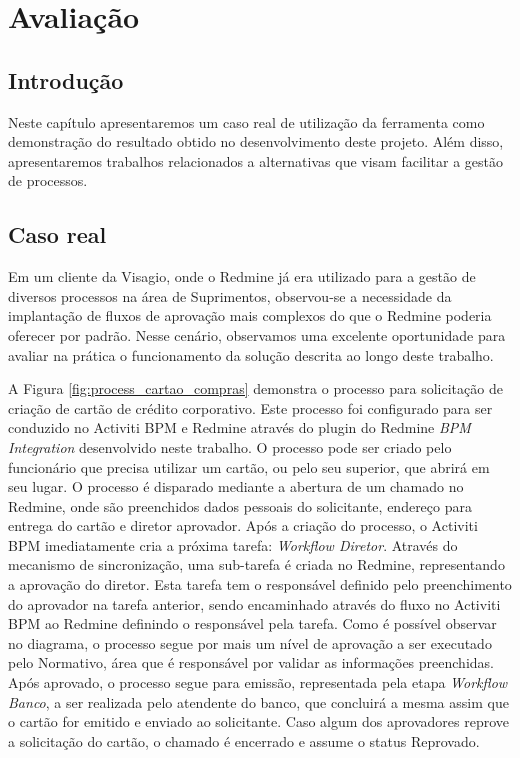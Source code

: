 \chapter{Avaliação}\label{chp:resultado}

\section{Introdução}\label{sec:resultado-introducao}
Neste capítulo apresentaremos um caso real de utilização da ferramenta como demonstração do resultado obtido no desenvolvimento deste projeto. Além disso, apresentaremos trabalhos relacionados a alternativas que visam facilitar a gestão de processos.

\section{Caso real}\label{sec:resultado-caso_real}

Em um cliente da Visagio, onde o Redmine já era utilizado para a gestão de diversos processos na área de Suprimentos, observou-se a necessidade da implantação de fluxos de aprovação mais complexos do que o Redmine poderia oferecer por padrão. Nesse cenário, observamos uma excelente oportunidade para avaliar na prática o funcionamento da solução descrita ao longo deste trabalho.

A Figura \ref{fig:process_cartao_compras} demonstra o processo para solicitação de criação de cartão de crédito corporativo. Este processo foi configurado para ser conduzido no Activiti BPM e Redmine através do plugin do Redmine \textit{BPM Integration} desenvolvido neste trabalho. O processo pode ser criado pelo funcionário que precisa utilizar um cartão, ou pelo seu superior, que abrirá em seu lugar. O processo é disparado mediante a abertura de um chamado no Redmine, onde são preenchidos dados pessoais do solicitante, endereço para entrega do cartão e diretor aprovador. Após a criação do processo, o Activiti BPM imediatamente cria a próxima tarefa: \textit{Workflow Diretor}. Através do mecanismo de sincronização, uma sub-tarefa é criada no Redmine, representando a aprovação do diretor. Esta tarefa tem o responsável definido pelo preenchimento do aprovador na tarefa anterior, sendo encaminhado através do fluxo no Activiti BPM ao Redmine definindo o responsável pela tarefa. Como é possível observar no diagrama, o processo segue por mais um nível de aprovação a ser executado pelo Normativo, área que é responsável por validar as informações preenchidas. Após aprovado, o processo segue para emissão, representada pela etapa \textit{Workflow Banco}, a ser realizada pelo atendente do banco, que concluirá a mesma assim que o cartão for emitido e enviado ao solicitante. Caso algum dos aprovadores reprove a solicitação do cartão, o chamado é encerrado e assume o status Reprovado.

